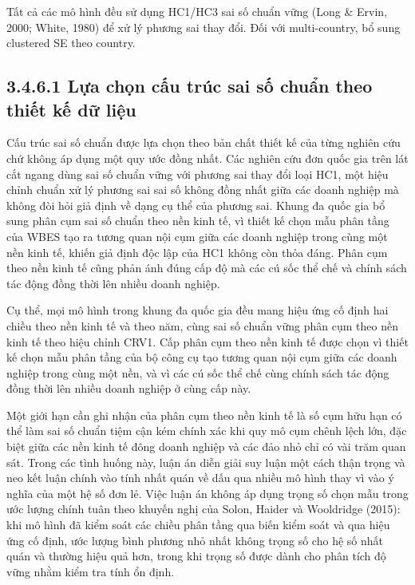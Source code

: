 \documentclass[
  a4paper,
  13pt]{extreport}
\begin{document}
Tất cả các mô hình đều sử dụng HC1/HC3 sai số chuẩn vững (Long \& Ervin,
2000; White, 1980) để xử lý phương sai thay đổi. Đối với multi-country,
bổ sung clustered SE theo country.

\hypertarget{lux1ef1a-chux1ecdn-cux1ea5u-truxfac-sai-sux1ed1-chuux1ea9n-theo-thiux1ebft-kux1ebf-dux1eef-liux1ec7u}{%
\subsection{3.4.6.1 Lựa chọn cấu trúc sai số chuẩn theo thiết kế dữ
liệu}\label{lux1ef1a-chux1ecdn-cux1ea5u-truxfac-sai-sux1ed1-chuux1ea9n-theo-thiux1ebft-kux1ebf-dux1eef-liux1ec7u}}

Cấu trúc sai số chuẩn được lựa chọn theo bản chất thiết kế của từng
nghiên cứu chứ không áp dụng một quy ước đồng nhất. Các nghiên cứu đơn
quốc gia trên lát cắt ngang dùng sai số chuẩn vững với phương sai thay
đổi loại HC1, một hiệu chỉnh chuẩn xử lý phương sai sai số không đồng
nhất giữa các doanh nghiệp mà không đòi hỏi giả định về dạng cụ thể của
phương sai. Khung đa quốc gia bổ sung phân cụm sai số chuẩn theo nền
kinh tế, vì thiết kế chọn mẫu phân tầng của WBES tạo ra tương quan nội
cụm giữa các doanh nghiệp trong cùng một nền kinh tế, khiến giả định độc
lập của HC1 không còn thỏa đáng. Phân cụm theo nền kinh tế cũng phản ánh
đúng cấp độ mà các cú sốc thể chế và chính sách tác động đồng thời lên
nhiều doanh nghiệp.

Cụ thể, mọi mô hình trong khung đa quốc gia đều mang hiệu ứng cố định
hai chiều theo nền kinh tế và theo năm, cùng sai số chuẩn vững phân cụm
theo nền kinh tế theo hiệu chỉnh CRV1. Cấp phân cụm theo nền kinh tế
được chọn vì thiết kế chọn mẫu phân tầng của bộ công cụ tạo tương quan
nội cụm giữa các doanh nghiệp trong cùng một nền, và vì các cú sốc thể
chế cùng chính sách tác động đồng thời lên nhiều doanh nghiệp ở cùng cấp
này.

Một giới hạn cần ghi nhận của phân cụm theo nền kinh tế là số cụm hữu
hạn có thể làm sai số chuẩn tiệm cận kém chính xác khi quy mô cụm chênh
lệch lớn, đặc biệt giữa các nền kinh tế đông doanh nghiệp và các đảo nhỏ
chỉ có vài trăm quan sát. Trong các tình huống này, luận án diễn giải
suy luận một cách thận trọng và neo kết luận chính vào tính nhất quán về
dấu qua nhiều mô hình thay vì vào ý nghĩa của một hệ số đơn lẻ. Việc
luận án không áp dụng trọng số chọn mẫu trong ước lượng chính tuân theo
khuyến nghị của Solon, Haider và Wooldridge (2015): khi mô hình đã kiểm
soát các chiều phân tầng qua biến kiểm soát và qua hiệu ứng cố định, ước
lượng bình phương nhỏ nhất không trọng số cho hệ số nhất quán và thường
hiệu quả hơn, trong khi trọng số được dành cho phân tích độ vững nhằm
kiểm tra tính ổn định.
\end{document}
